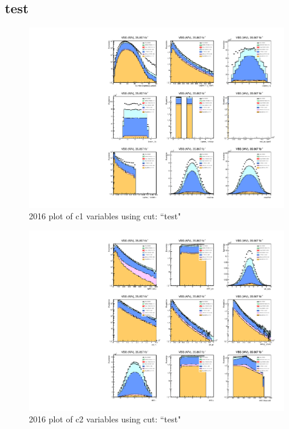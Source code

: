 \documentclass{article}
\begin{document}
      \subsection*{test}
                        \begin{figure}[H]
                            \centering
                            \caption{2016 plot of c1 variables using cut: ``test"}
                            \includegraphics[width=\textwidth]{2016/c1_2016_test.pdf}
                        \end{figure}    
                        \begin{figure}[H]
                            \centering
                            \caption{2016 plot of c2 variables using cut: ``test"}
                            \includegraphics[width=\textwidth]{2016/c2_2016_test.pdf}
                        \end{figure}    
\end{document}
